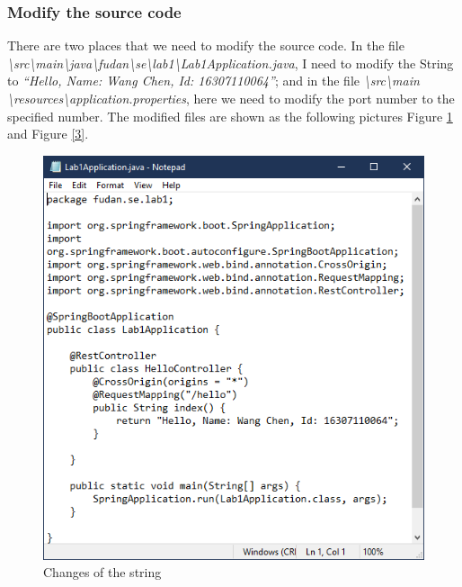 \documentclass[a4paper]{report}
\begin{document}
\subsubsection{Modify the source code}
There are two places that we need to modify the source code. In the file \emph{\textbackslash src\textbackslash main\textbackslash java\textbackslash fudan\textbackslash se\textbackslash lab1\textbackslash Lab1Application.java}, I need to modify the String to \emph{``Hello, Name: Wang Chen, Id: 16307110064''}; and in the file \emph{\textbackslash src\textbackslash main \textbackslash resources\textbackslash application.properties}, here we need to modify the port number to the specified number. The modified files are shown as the following pictures Figure \ref{2} and Figure \ref{3}.
\begin{figure}
  \centering
  \includegraphics[width=12cm]{Figures/Source.png}
  \caption{Changes of the string}\label{2}
\end{figure}
\end{document}
